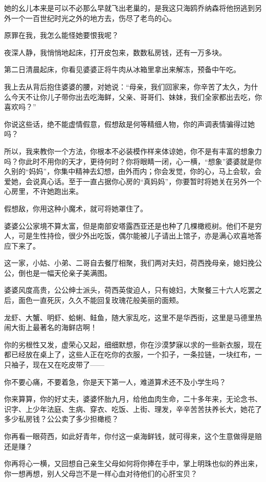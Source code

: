 \par 她的幺儿本来是可以不必那么早就飞出老巢的，是我这只海鸥乔纳森将他拐逃到另外一个一百世纪时光之外的地方去，伤尽了老鸟的心。
\par 原罪在我，我怎么能怪她要恨我呢？
\par 夜深人静，我悄悄地起床，打开皮包来，数数私房钱，还有一万多块。
\par 第二日清晨起床，你看见婆婆正将牛肉从冰箱里拿出来解冻，预备中午吃。
\par 我上去从背后抱住婆婆的腰，对她说：“母亲，我们回家来，你辛苦了太久，为什么今天不让你儿子带你出去吃海鲜，父亲、哥哥们、妹妹，我们全家都出去吃，你喜欢吗？”
\par 你说这些话，绝不能虚情假意，假想敌是何等精细人物，你的声调表情骗得过她吗？
\par 所以，我来教你一个方法，你根本不必装模作样来体谅她，你不是有丰富的想象力吗？你此时不用你的天才，更待何时？你将眼睛一闭，心一横，“想象”婆婆就是你久别的“妈妈”，你集中精神去幻想，由外而内；你会发觉，你的心，马上会软，会爱她，会说真心话。至于一直占据你心房的“真妈妈”，你要暂时将她关在另外一个心房里，不许她跑出来。
\par 假想敌，你用这种小魔术，就可将她罩住了。
\par 婆婆公公家境不算太富，但是南部安塔露西亚还是也种了几棵橄榄树。他们不是穷人，可是生性持俭，很少外出吃饭，偶尔能被儿子请出上馆子，亦是满心欢喜地答应下来了。
\par 这一家，小姑、小弟、二哥自去餐厅相聚，我们两对夫妇，荷西挽母亲，媳妇挽公公，倒也是一幅天伦亲子美满图。
\par 婆婆风度高贵，公公绅士派头，荷西英俊迫人，只有媳妇，大聚餐三十六人吃罢之后，面色一直死灰，久久不能回复玫瑰花般美丽的面颊。
\par 龙虾、大蟹、明虾、蛤蜊、鲑鱼，随大家乱吃，这里不是华西街，这里是马德里热闹大街上最著名的海鲜店啊！
\par 你的劣根性又发，虚荣心又起，细细默想，你在沙漠梦寐以求的一些新衣服，现在都已经放在桌上了，这些人正在吃你的衣服，一个扣子，一条拉链，一块红布，一只袖子，现在又在吃皮带了——
\par 你不要心痛，不要着急，你是天下第一人，难道算术还不及小学生吗？
\par 你来算算，你的好丈夫，婆婆怀胎九月，给他血肉生命，二十多年来，无论念书、识字、上少年法庭、生病、穿衣、吃饭、上街、理发，辛辛苦苦扶养长大，她花了多少私房钱？公公卖了多少担橄榄？
\par 你再看一眼荷西，如此好青年，你付这一桌海鲜钱，就可得来，这个生意做得是赔还是赚？
\par 你再将心一横，又回想自己亲生父母如何将你捧在手中，掌上明珠也似的养出来，你一想再想，别人父母岂不是一样心血对待他们的心肝宝贝？
